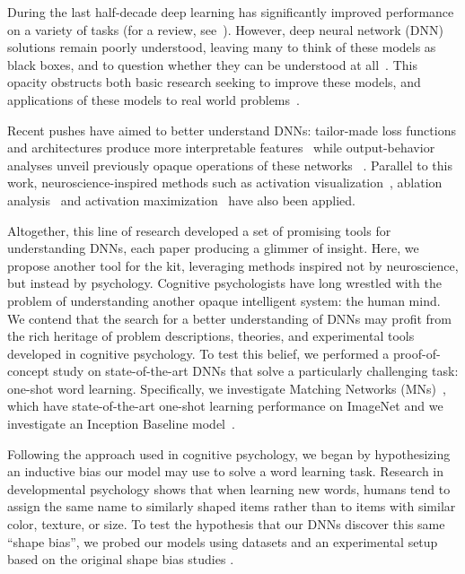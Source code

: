 \documentclass{article}
\begin{document}
During the last half-decade deep learning has significantly improved performance on a variety of tasks (for a review, see~\citet{lecun2015deep}). However, deep neural network (DNN) solutions remain poorly understood, leaving many to think of these models as black boxes, and to question whether they can be understood at all~\citep{bornsteinartificial,lipton2016mythos}. This opacity obstructs both basic research seeking to improve these models, and applications of these models to real world problems~\citep{caruana2015intelligible}.

Recent pushes have aimed to better understand DNNs: tailor-made loss functions and architectures produce more interpretable features~\citep{higgins2016early,raposo2017discovering} while output-behavior analyses unveil previously opaque operations of these networks ~\citep{Karpathy2015visualizing}. Parallel to this work, neuroscience-inspired methods such as activation visualization~\citep{li2015visualizing},  ablation analysis~\citep{zeiler2014visualizing} and activation maximization~\citep{yosinski2015understanding} have also been applied. 

Altogether, this line of research developed a set of promising tools for understanding DNNs, each paper producing a glimmer of insight. Here, we propose another tool for the kit, leveraging methods inspired not by neuroscience, but instead by psychology. Cognitive psychologists have long wrestled with the problem of understanding another opaque intelligent system: the human mind. We contend that the search for a better understanding of DNNs may profit from the rich heritage of problem descriptions, theories, and experimental tools developed in cognitive psychology. To test this belief, we performed a proof-of-concept study on state-of-the-art DNNs that solve a particularly challenging task: one-shot word learning. Specifically, we investigate Matching Networks (MNs)~\citep{vinyals2016matching}, which have state-of-the-art one-shot learning performance on ImageNet and we investigate an Inception Baseline model~\citep{szegedy2015going}.

Following the approach used in cognitive psychology, we began by hypothesizing an inductive bias our model may use to solve a word learning task. Research in developmental psychology shows that when learning new words, humans tend to assign the same name to similarly shaped items rather than to items with similar color, texture, or size. To test the hypothesis that our DNNs discover this same ``shape bias'', we probed our models using datasets and an experimental setup based on the original shape bias studies \citep{landau1988importance}.
\end{document}
